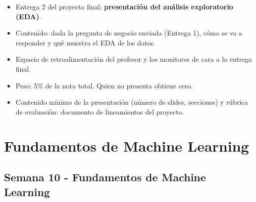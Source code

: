 \documentclass{article}
\begin{document}
\begin{itemize}
  \item Entrega 2 del proyecto final: \textbf{presentación del análisis exploratorio (EDA)}.
  \item Contenido: dada la pregunta de negocio enviada (Entrega 1), cómo se va a responder y qué muestra el EDA de los datos.
  \item Espacio de retroalimentación del profesor y los monitores de cara a la entrega final.
  \item Peso: 5\% de la nota total. Quien no presenta obtiene cero.
  \item Contenido mínimo de la presentación (número de slides, secciones) y rúbrica de evaluación: documento de lineamientos del proyecto.
\end{itemize}

\newpage
\section{Fundamentos de Machine Learning}

\subsection{Semana 10 - Fundamentos de Machine Learning}
\vspace{0.2 cm}
\end{document}
